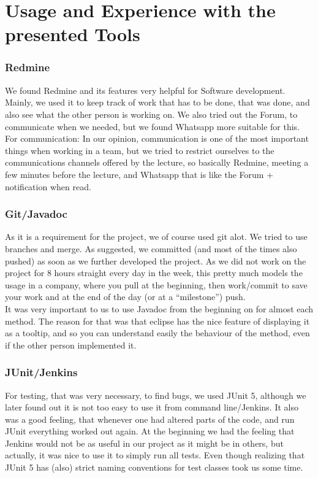 \section{Usage and Experience with the presented Tools} 
\begin{frame}[fragile=singleslide]
	\frametitle{Redmine}
	We found Redmine and its features very helpful for Software development. Mainly, we used it to keep track of work that has to be done, that was done, and also see what the other person is working on. We also tried out the Forum, to communicate when we needed, but we found Whatsapp more suitable for this.\\
	For communication: In our opinion, communication is one of the most important things when working in a team, but we tried to restrict ourselves to the communications channels offered by the lecture, so basically Redmine, meeting a few minutes before the lecture, and Whatsapp that is like the Forum + notification when read.
  \end{frame}
	
	\begin{frame}[fragile=singleslide]
		\frametitle{Git/Javadoc}
	As it is a requirement for the project, we of course used git alot. We tried to use branches and merge. As suggested, we committed (and most of the times also pushed) as soon as we further developed the project. As we did not work on the project for 8 hours straight every day in the week, this pretty much models the usage in a company, where you pull at the beginning, then work/commit to save your work and at the end of the day (or at a ``milestone'') push.\\
	It was very important to us to use Javadoc from the beginning on for almost each method. The reason for that was that eclipse has the nice feature of displaying it as a tooltip, and so you can understand easily the behaviour of the method, even if the other person implemented it.
  \end{frame}
	
	\begin{frame}[fragile=singleslide]
			\frametitle{JUnit/Jenkins}
	For testing, that was very necessary, to find bugs, we used JUnit 5, although we later found out it is not too easy to use it from command line/Jenkins. It also was a good feeling, that whenever one had altered parts of the code, and run JUnit everything worked out again. At the beginning we had the feeling that Jenkins would not be as useful in our project as it might be in others, but actually, it was nice to use it to simply run all tests. Even though realizing that JUnit 5 has (also) strict naming conventions for test classes took us some time.
  \end{frame}
